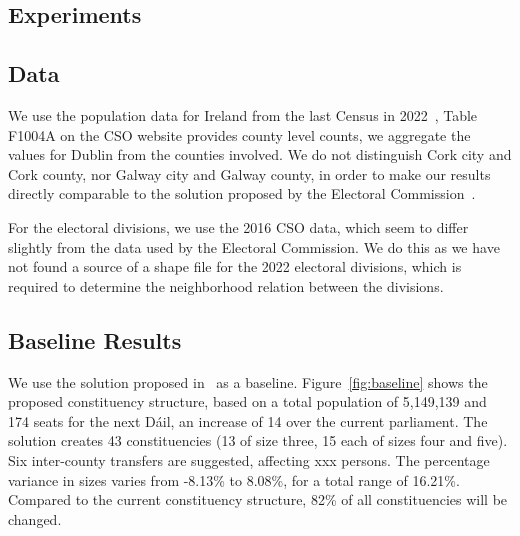 \documentclass[runningheads]{llncs}
\begin{document}
\subsection{Experiments}
\subsection{Data}
We use the population data for Ireland from the last Census in 2022~\cite{CSO2022}, Table F1004A on the CSO website provides county level counts, we aggregate the values for Dublin from the counties involved. We do not distinguish Cork city and Cork county, nor Galway city and Galway county, in order to make our results directly comparable to the solution proposed by the Electoral Commission~\cite{}. 

For the electoral divisions, we use the 2016 CSO data, which seem to differ slightly from the data used by the Electoral Commission. We do this as we have not found a source of a shape file for the 2022 electoral divisions, which is required to determine the neighborhood relation between the divisions. 

\subsection{Baseline Results}

We use the solution proposed in~\cite{ElectoralCommission2023} as a baseline. Figure~\ref{fig:baseline} shows the proposed constituency structure, based on a total population of 5,149,139 and 174 seats for the next Dáil, an increase of 14 over the current parliament. The solution creates 43 constituencies (13 of size three, 15 each of sizes four and five). Six inter-county transfers are suggested, affecting xxx persons. The percentage variance in sizes varies from -8.13\% to 8.08\%, for a total range of 16.21\%. Compared to the current constituency structure, 82\% of all constituencies will be changed.
\end{document}
